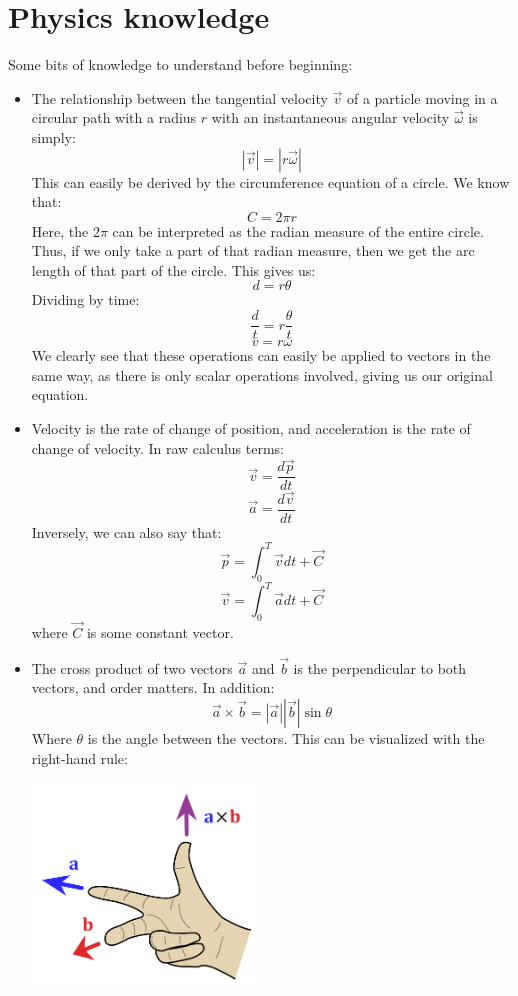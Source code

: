 \documentclass{article}
\begin{document}
\section{Physics knowledge}
Some bits of knowledge to understand before beginning:
\begin{itemize}
    \item The relationship between the tangential velocity $\vec{v}$ of a particle moving in a circular path with a radius $r$ with an instantaneous angular velocity $\vec{\omega}$ is simply:
    \[
        |\vec{v}| = |r\vec{\omega}|
    \]
    This can easily be derived by the circumference equation of a circle. We know that:
    \[
        C = 2 \pi r
    \]
    Here, the $2\pi$ can be interpreted as the radian measure of the entire circle.
    Thus, if we only take a part of that radian measure, then we get the arc length of
    that part of the circle. This gives us:
    \[
        d = r \theta
    \]
    Dividing by time:
    \[
        \frac{d}{t} = r \frac{\theta}{t}
    \]
    \[
        v = r \omega
    \]
    We clearly see that these operations can easily be applied to vectors in the same way, as there is only scalar operations involved, giving us our original equation.
    \item Velocity is the rate of change of position, and acceleration is the rate of change of velocity.
    In raw calculus terms:
    \[
        \vec{v} = \frac{d\vec{p}}{dt}
    \]
    \[
        \vec{a} = \frac{d\vec{v}}{dt}
    \]
    Inversely, we can also say that:
    \[
        \vec{p} = \int_{0}^{T} \vec{v} dt + \vec{C}
    \]
    \[
        \vec{v} = \int_{0}^{T} \vec{a} dt + \vec{C}
    \]
    where $\vec{C}$ is some constant vector.
    \item The cross product of two vectors $\vec{a}$ and $\vec{b}$ is the perpendicular
    to both vectors, and order matters. In addition:
    \[
        \vec{a} \times \vec{b} = |\vec{a}||\vec{b}| \sin \theta
    \]
    Where $\theta$ is the angle between the vectors. This can be visualized with the 
    right-hand rule:
    \begin{center}
        \includegraphics[width=6cm]{rh_rule}
    \end{center}
\end{itemize}
\end{document}

